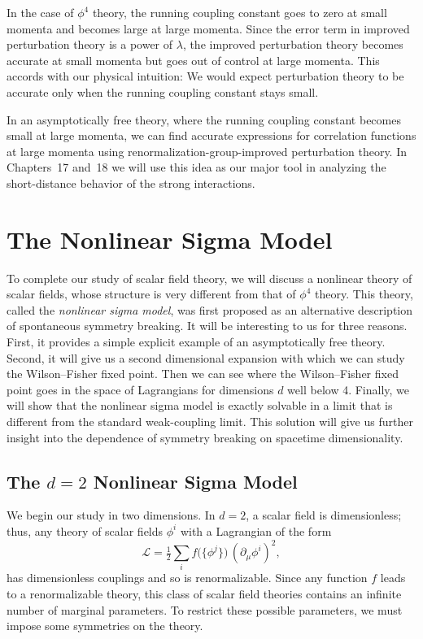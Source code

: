 In the case of $\phi^4$ theory, the running coupling constant goes to zero at
small momenta and becomes large at large momenta.  Since the error term in
improved perturbation theory is a power of $\lambda$, the improved
perturbation theory becomes accurate at small momenta but goes out of control
at large momenta.  This accords with our physical intuition: We would expect
perturbation theory to be accurate only when the running coupling constant
stays small.

In an asymptotically free theory, where the running coupling constant becomes
small at large momenta, we can find accurate expressions for correlation
functions at large momenta using renormalization-group-improved perturbation
theory.  In Chapters~17 and~18 we will use this idea as our major tool in
analyzing the short-distance behavior of the strong interactions.

\section{The Nonlinear Sigma Model}

To complete our study of scalar field theory, we will discuss a nonlinear
theory of scalar fields, whose structure is very different from that of
$\phi^4$ theory.  This theory, called the \emph{nonlinear sigma model}, was
first proposed as an alternative description of spontaneous symmetry
breaking.  It will be interesting to us for three reasons.  First, it provides
a simple explicit example of an asymptotically free theory.  Second, it will
give us a second dimensional expansion with which we can study the
Wilson--Fisher fixed point.  Then we can see where the Wilson--Fisher fixed
point goes in the space of Lagrangians for dimensions $d$ well below 4.
Finally, we will show that the nonlinear sigma model is exactly solvable in a
limit that is different from the standard weak-coupling limit.  This solution
will give us further insight into the dependence of symmetry breaking on
spacetime dimensionality.

\subsection{The $d = 2$ Nonlinear Sigma Model}

We begin our study in two dimensions.  In $d = 2$, a scalar field is
dimensionless; thus, any theory of scalar fields $\phi^i$ with a Lagrangian
of the form
\begin{equation}
  \mathcal{L} = \tfrac{1}{2}\sum_i f\bigl( \{\phi^j\} \bigr)\,
    (\partial_\mu\phi^i)^2 ,
  \label{eq:13.65}
\end{equation}
has dimensionless couplings and so is renormalizable.  Since any function
$f$ leads to a renormalizable theory, this class of scalar field theories
contains an infinite number of marginal parameters.  To restrict these
possible parameters, we must impose some symmetries on the theory.


